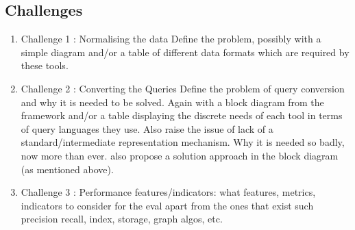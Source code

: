 \documentclass{llncs}
\newcommand{\todoinline}[1]{
    \todo[inline]{#1}
}
\newcommand{\todoiteminline}[3]{
    \todoitemtemplate{#1}{#2}{#3}{inline}{red}
}
\newcommand{\todoitemtemplate}[5]{%
\todo[#4,color=#5,caption=X]{{#1}{ \textbf{{\tiny{for}} #2}:}{#3}}%
}
\begin{document}
\begin{itemize}
    \subsection{Challenges}
    \todoinline{pending}
        \begin{enumerate}
            \item Challenge 1 : Normalising the data
            Define the problem, possibly with a simple diagram and/or a table of different data formats which are required by these tools.
            \item Challenge 2 : Converting the Queries
            Define the problem of query conversion and why it is needed to be solved. Again with a block diagram from the framework and/or a table displaying the discrete needs of each tool in terms of query languages they use.
            Also raise the issue of lack of a standard/intermediate representation mechanism. Why it is needed so badly, now more than ever.
            also propose a solution approach in the block diagram (as mentioned above).
            \item Challenge 3 : Performance features/indicators: what features, metrics, indicators to consider for the eval apart from the ones that exist such precision recall, index, storage, graph algos, etc.
        \end{enumerate}
        
    


\end{itemize}
\end{document}

